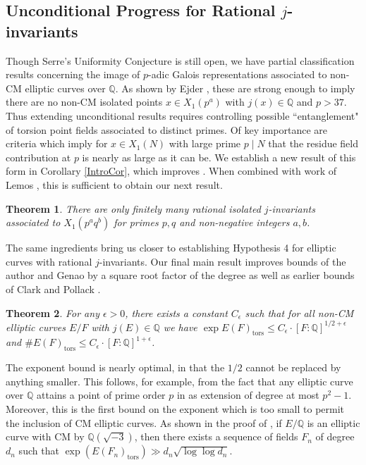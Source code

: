 \documentclass{amsart}
\newtheorem{theorem}{Theorem}
\theoremstyle{definition}
\newcommand{\tors}{\operatorname{tors}}
\newcommand{\Q}{\mathbb{Q}}
\begin{document}
\subsection{Unconditional Progress for Rational $j$-invariants} Though Serre's Uniformity Conjecture is still open, we have partial classification results concerning the image of $p$-adic Galois representations associated to non-CM elliptic curves over $\Q$. As shown by Ejder \cite{Ejder22}, these are strong enough to imply there are no non-CM isolated points $x \in X_1(p^a)$ with $j(x) \in \Q$ and $p>37$. Thus extending unconditional results requires controlling possible ``entanglement" of torsion point fields associated to distinct primes. Of key importance are criteria which imply for $x\in X_1(N)$ with large prime $p \mid N$ that the residue field contribution at $p$ is nearly as large as it can be. We establish a new result of this form in Corollary \ref{IntroCor}, which improves \cite[Proposition 5]{BourdonGenao}. When combined with work of Lemos \cite{lemosTrans,lemosZ}, this is sufficient to obtain our next result.

\begin{theorem}\label{finiteness_2_primes}
    There are only finitely many rational isolated $j$-invariants associated to $X_1(p^aq^b)$ for primes $p,q$ and non-negative integers $a,b$.
\end{theorem}

The same ingredients bring us closer to establishing Hypothesis 4 for elliptic curves with rational $j$-invariants. Our final main result improves bounds of the author and Genao \cite[Theorem 2]{BourdonGenao} by a square root factor of the degree as well as earlier bounds of Clark and Pollack \cite[Theorem 1.3]{CP18}.

    \begin{theorem}\label{PolynomialBoundsThm}
        For any $\epsilon>0$, there exists a constant $C_{\epsilon}$ such that for all non-CM elliptic curves $E/F$ with $j(E) \in \Q$ we have  $
    \exp E(F)_{\tors} \leq C_{\epsilon} \cdot [F:\Q]^{1/2+\epsilon}
    $ and $\# E(F)_{\tors} \leq C_{\epsilon} \cdot [F:\Q]^{1+\epsilon}$.
    \end{theorem}
\noindent The exponent bound is nearly optimal, in that the $1/2$ cannot be replaced by anything smaller. This follows, for example, from the fact that any elliptic curve over $\Q$ attains a point of prime order $p$ in as extension of degree at most $p^2-1$. Moreover,
this is the first bound on the exponent  which is too small to permit the inclusion of CM elliptic curves. As shown in the proof of \cite[Theorem 6]{CCS13}, if $E/\Q$ is an elliptic curve with CM by $\Q(\sqrt{-3})$, then there exists a sequence of fields $F_n$ of degree $d_n$ such that $\exp(E(F_n)_{\tors})\gg d_n\sqrt{\log \log d_n}$. 
\end{document}
